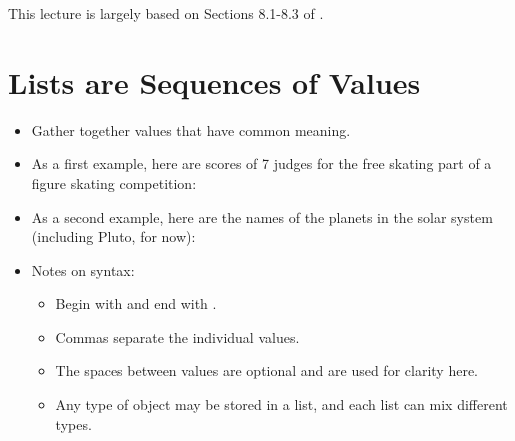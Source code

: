 \documentclass[letterpaper,10pt,english]{sphinxmanual}
\begin{document}
This lecture is largely based on Sections 8.1-8.3 of .


\section{Lists are Sequences of Values}
\label{\detokenize{lecture_notes/lec08_lists1:lists-are-sequences-of-values}}\begin{itemize}
\item {} 
Gather together values that have common meaning.

\item {} 
As a first example, here are scores of 7 judges for the free
skating part of a figure skating competition:

\begin{sphinxVerbatim}[commandchars=\\\{\}]
  \PYG{p}{[}      \PYG{p}{]}
\end{sphinxVerbatim}

\item {} 
As a second example, here are the names of the planets in the solar
system (including Pluto, for now):

\begin{sphinxVerbatim}[commandchars=\\\{\}]
  \PYG{p}{[}    
       \PYG{p}{]}
\end{sphinxVerbatim}

\item {} 
Notes on syntax:
\begin{itemize}
\item {} 
Begin with \sphinxcode{\sphinxupquote{{[}}} and end with \sphinxcode{\sphinxupquote{{]}}}.

\item {} 
Commas separate the individual values.

\item {} 
The spaces between values are optional and are used for clarity
here.

\item {} 
Any type of object may be stored in a list, and each list can mix
different types.

\end{itemize}

\end{itemize}
\end{document}

